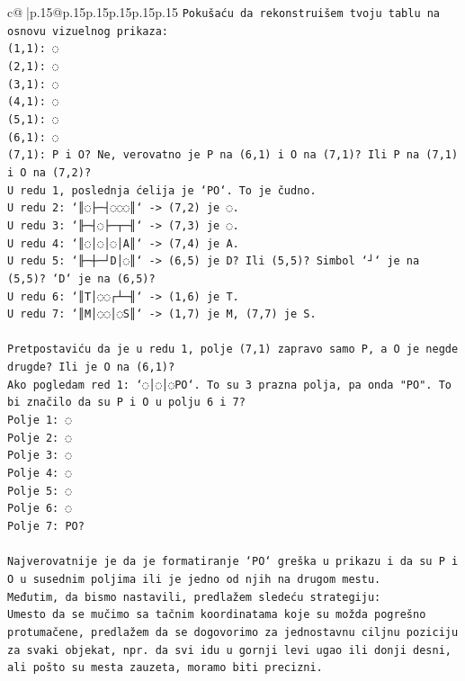 \documentclass{article}
\begin{document}
{\begin{supertabular}{c@{$\;$}|p{.15\linewidth}@{}p{.15\linewidth}p{.15\linewidth}p{.15\linewidth}p{.15\linewidth}p{.15\linewidth}}
{{{\texttt{Pokušaću da rekonstruišem tvoju tablu na osnovu vizuelnog prikaza:} \\
\texttt{(1,1): ◌} \\
\texttt{(2,1): ◌} \\
\texttt{(3,1): ◌} \\
\texttt{(4,1): ◌} \\
\texttt{(5,1): ◌} \\
\texttt{(6,1): ◌} \\
\texttt{(7,1): P i O? Ne, verovatno je P na (6,1) i O na (7,1)? Ili P na (7,1) i O na (7,2)?} \\
\texttt{U redu 1, poslednja ćelija je `PO`. To je čudno.} \\
\texttt{U redu 2: `║◌├─┤◌◌◌║` {-}> (7,2) je ◌.} \\
\texttt{U redu 3: `╟─┤◌├─┬─╢` {-}> (7,3) je ◌.} \\
\texttt{U redu 4: `║◌│◌│◌│A║` {-}> (7,4) je A.} \\
\texttt{U redu 5: `╟─┼─┘D│◌║` {-}> (6,5) je D? Ili (5,5)? Simbol `┘` je na (5,5)? `D` je na (6,5)?} \\
\texttt{U redu 6: `║T│◌◌┌┴─╢` {-}> (1,6) je T.} \\
\texttt{U redu 7: `║M│◌◌│◌S║` {-}> (1,7) je M, (7,7) je S.} \\
\\ 
\texttt{Pretpostaviću da je u redu 1, polje (7,1) zapravo samo P, a O je negde drugde? Ili je O na (6,1)?} \\
\texttt{Ako pogledam red 1: `◌│◌│◌PO`. To su 3 prazna polja, pa onda "PO". To bi značilo da su P i O u polju 6 i 7?} \\
\texttt{Polje 1: ◌} \\
\texttt{Polje 2: ◌} \\
\texttt{Polje 3: ◌} \\
\texttt{Polje 4: ◌} \\
\texttt{Polje 5: ◌} \\
\texttt{Polje 6: ◌} \\
\texttt{Polje 7: PO?} \\
\\ 
\texttt{Najverovatnije je da je formatiranje `PO` greška u prikazu i da su P i O u susednim poljima ili je jedno od njih na drugom mestu.} \\
\texttt{Međutim, da bismo nastavili, predlažem sledeću strategiju:} \\
\texttt{Umesto da se mučimo sa tačnim koordinatama koje su možda pogrešno protumačene, predlažem da se dogovorimo za jednostavnu ciljnu poziciju za svaki objekat, npr. da svi idu u gornji levi ugao ili donji desni, ali pošto su mesta zauzeta, moramo biti precizni.} \\
}}}
\end{supertabular}}
\end{document}
